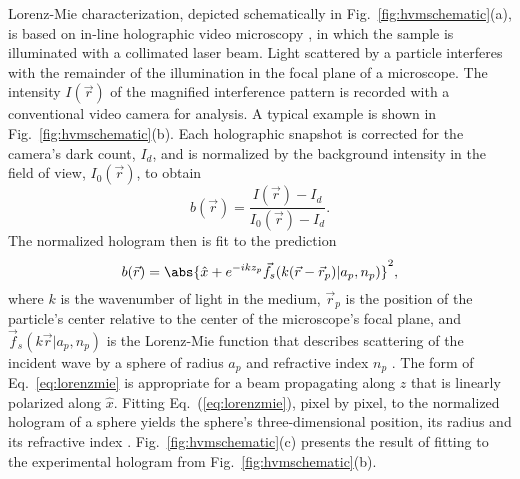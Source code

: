 Lorenz-Mie characterization, depicted schematically in
Fig.~\ref{fig:hvmschematic}(a),
is based on in-line holographic video microscopy \cite{sheng06},
in which the sample is illuminated with a collimated laser beam.
Light scattered by a particle interferes with the remainder of the
illumination in the focal plane of a microscope.
The intensity $I(\vec{r})$ of the magnified interference pattern is
recorded with a conventional video camera for analysis.
A typical example is shown in Fig.~\ref{fig:hvmschematic}(b).
Each holographic snapshot is corrected for the camera's
dark count, $I_d$, and is normalized by the
background intensity in the field of view, $I_0(\vec{r})$,
to obtain \cite{lee07,lee07a,krishnatreya14}
\begin{equation}
  \label{eq:normalization}
  b(\vec{r}) = \frac{I(\vec{r}) - I_d}{I_0(\vec{r}) - I_d}.
\end{equation}
The normalized hologram then is fit to the prediction
\cite{lee07a}
\begin{equation}
  \label{eq:lorenzmie}
  b(\vec{r}) 
  = 
  \abs{\hat{x} 
    + 
    e^{-i k z_p} \vec{f}_s(k(\vec{r} - \vec{r}_p)\vert a_p, n_p)}^2,
\end{equation}
where $k$ is the wavenumber of light in the medium,
$\vec{r}_p$ is the position of the particle's center relative
to the center of the microscope's focal plane, and
$\vec{f}_s(k \vec{r} \vert a_p, n_p)$ is the Lorenz-Mie function
that describes scattering of the incident wave by a sphere of radius $a_p$
and refractive index $n_p$ \cite{bohren83,mishchenko02}.
The form of Eq.~\eqref{eq:lorenzmie} is appropriate for a beam
propagating along $\hat{z}$ that is linearly polarized along $\hat{x}$.
Fitting Eq.~(\ref{eq:lorenzmie}), pixel by pixel,
to the normalized hologram of a sphere yields the sphere's three-dimensional position, 
its radius and its refractive index \cite{lee07a}.
Fig.~\ref{fig:hvmschematic}(c) presents the result of fitting to the
experimental hologram from Fig.~\ref{fig:hvmschematic}(b).

